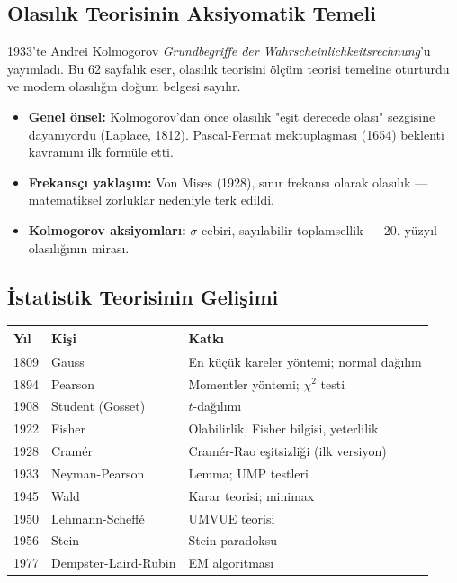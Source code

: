 \subsection{Olasılık Teorisinin Aksiyomatik Temeli}

1933'te Andrei Kolmogorov \textit{Grundbegriffe der Wahrscheinlichkeitsrechnung}'u yayımladı. Bu 62 sayfalık eser, olasılık teorisini ölçüm teorisi temeline oturturdu ve modern olasılığın doğum belgesi sayılır.

\begin{itemize}
  \item \textbf{Genel önsel:} Kolmogorov'dan önce olasılık "eşit derecede olası" sezgisine dayanıyordu (Laplace, 1812). Pascal-Fermat mektuplaşması (1654) beklenti kavramını ilk formüle etti.
  \item \textbf{Frekansçı yaklaşım:} Von Mises (1928), sınır frekansı olarak olasılık --- matematiksel zorluklar nedeniyle terk edildi.
  \item \textbf{Kolmogorov aksiyomları:} $\sigma$-cebiri, sayılabilir toplamsellik --- 20. yüzyıl olasılığının mirası.
\end{itemize}

\subsection{İstatistik Teorisinin Gelişimi}

\begin{center}
\renewcommand{\arraystretch}{1.4}
\small
\begin{tabular}{p{1.5cm}p{3cm}p{8cm}}
\hline
\textbf{Yıl} & \textbf{Kişi} & \textbf{Katkı} \\
\hline
1809 & Gauss & En küçük kareler yöntemi; normal dağılım \\
1894 & Pearson & Momentler yöntemi; $\chi^2$ testi \\
1908 & Student (Gosset) & $t$-dağılımı \\
1922 & Fisher & Olabilirlik, Fisher bilgisi, yeterlilik \\
1928 & Cramér & Cramér-Rao eşitsizliği (ilk versiyon) \\
1933 & Neyman-Pearson & Lemma; UMP testleri \\
1945 & Wald & Karar teorisi; minimax \\
1950 & Lehmann-Scheffé & UMVUE teorisi \\
1956 & Stein & Stein paradoksu \\
1977 & Dempster-Laird-Rubin & EM algoritması \\
\hline
\end{tabular}
\end{center}

